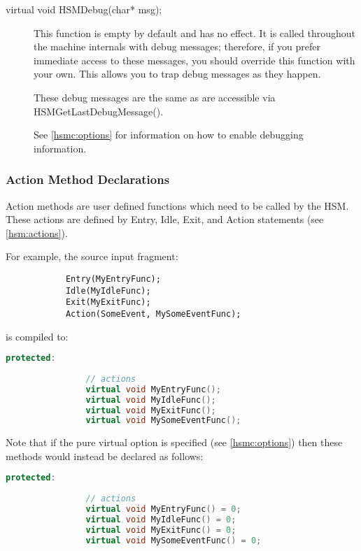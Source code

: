 \documentclass[titlepage,letterpaper]{report}
\begin{document}
\begin{description}
\item[virtual void HSMDebug(char* msg);]

    This function is empty by default and has no effect.  It is called throughout the machine internals
		with debug messages; therefore, if you prefer immediate access to these messages, you should override
		this function with your own.  This allows you to trap debug messages as they happen.
		
    These debug messages are the same as are accessible via HSMGetLastDebugMessage().

		See \ref{hsmc:options} for information on how to enable debugging information.
		
\end{description}



\subsubsection{Action Method Declarations}

Action methods are user defined functions which need to be called by the HSM.  These actions
are defined by Entry, Idle, Exit, and Action statements (see \ref{hsm:actions}).

For example, the source input fragment:

\begin{lstlisting}
			Entry(MyEntryFunc);
			Idle(MyIdleFunc);
			Exit(MyExitFunc);
			Action(SomeEvent, MySomeEventFunc);
\end{lstlisting}

is compiled to:

\begin{lstlisting}[language=C++]
			protected:
			
				// actions
				virtual void MyEntryFunc();
				virtual void MyIdleFunc();
				virtual void MyExitFunc();
				virtual void MySomeEventFunc();
\end{lstlisting}

Note that if the pure virtual option is specified (see \ref{hsmc:options}) then these methods
would instead be declared as follows:

\begin{lstlisting}[language=C++]
			protected:
			
				// actions
				virtual void MyEntryFunc() = 0;
				virtual void MyIdleFunc() = 0;
				virtual void MyExitFunc() = 0;
				virtual void MySomeEventFunc() = 0;
\end{lstlisting}
\end{document}
